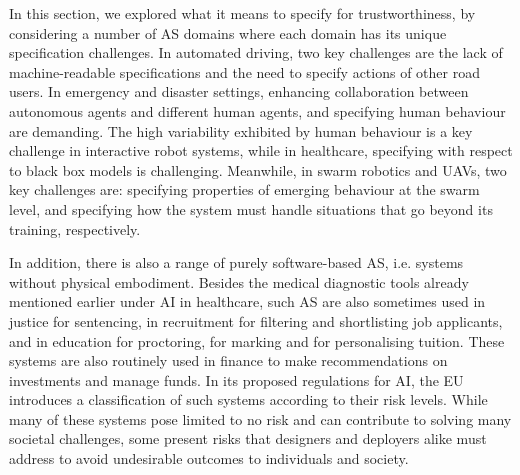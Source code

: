 \documentclass[sigconf,nonacm]{acmart}%
\begin{document}
	\noindent 
	In this section, we explored what it means to specify for trustworthiness, by considering a number of AS domains where each domain has its unique specification challenges.
	In automated driving, two key challenges are the lack of machine-readable specifications and the need to specify actions of other road users. 
	In emergency and disaster settings, enhancing collaboration between autonomous agents and different human agents, and specifying human behaviour are demanding. 
	The high variability exhibited by human behaviour is a key challenge in interactive robot systems, while in healthcare, specifying with respect to black box models is challenging. 
	Meanwhile, in swarm robotics and UAVs, two key challenges are: specifying properties of emerging behaviour at the swarm level, and specifying how the system must handle situations that go beyond its training, respectively. 
	
	In addition, there is also a range of purely software-based AS, i.e. systems without physical embodiment. Besides the medical diagnostic tools already mentioned earlier under AI in healthcare, such AS are also sometimes used in justice for sentencing, in recruitment for filtering and shortlisting job applicants, and in education for proctoring, for marking and for personalising tuition. These systems are also routinely used in finance to make recommendations on investments and manage funds. In its proposed regulations for AI, the EU \cite{EU:2021} introduces a classification of such systems according to their risk levels. While many of these systems pose limited to no risk and can contribute to solving many societal challenges, some present risks that designers and deployers alike must address to avoid undesirable outcomes to individuals and society. %
	
\end{document}
